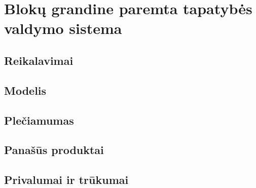 \section{Blokų grandine paremta tapatybės valdymo sistema}

\subsection{Reikalavimai}

\subsection{Modelis}

\subsection{Plečiamumas}

\subsection{Panašūs produktai}

\subsection{Privalumai ir trūkumai}